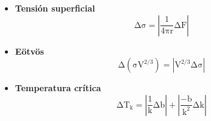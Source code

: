 \begin{itemize}
	
	\item \textbf{Tensión superficial}
	\[\mathrm{\Delta \sigma = \left\vert \frac{1}{4\pi r} \Delta F\right\vert }\]
	
	\item\textbf{Eötvös}
	\[\mathrm{\Delta \left( \sigma V^{2/3} \right) = \left\vert V^{2/3} \Delta \sigma \right\vert}\]
	
	\item\textbf{Temperatura crítica}
	\[\mathrm{\Delta T_{k} = \left\vert \frac{1}{k} \Delta b\right\vert  + \left\vert \frac{-b}{k^{2}} \Delta k\right\vert}\]
	
\end{itemize}